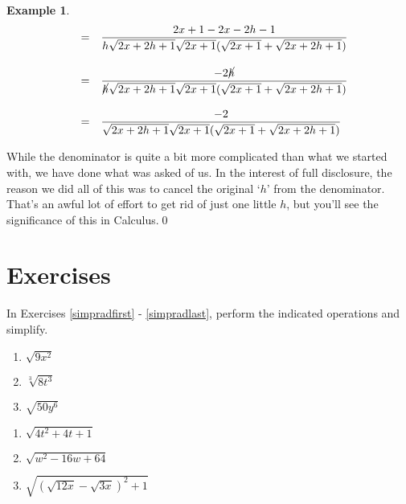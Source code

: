 \documentclass[11pt]{article}
\theoremstyle{definition}  %
\newtheorem{ex}{\bf Example}
\newcounter{HW}
\begin{document}
\begin{ex}
\[\begin{array}{rcl}
& = & \dfrac{2x+1 -2x-2h-1}{h\sqrt{2x+2h+1} \sqrt{2x+1}(\sqrt{2x+1} + \sqrt{2x+2h+1})} \\[20pt]

& = & \dfrac{-2\cancel{h}}{\cancel{h}\sqrt{2x+2h+1} \sqrt{2x+1}(\sqrt{2x+1} + \sqrt{2x+2h+1})} \\[20pt]
& = & \dfrac{-2}{\sqrt{2x+2h+1} \sqrt{2x+1}(\sqrt{2x+1} + \sqrt{2x+2h+1})} \\
\end{array}\] 

While the denominator is quite a bit more complicated than what we started with, we have done what was asked of us.  In the interest of full disclosure, the reason we did all of this was to cancel the original `$h$' from the denominator. That's an awful lot of effort to get rid of just one little $h$, but you'll see the significance of this in Calculus.\qed

\end{ex}

\newpage

\section{Exercises}

In Exercises \ref{simpradfirst} - \ref{simpradlast}, perform the indicated operations and simplify.

\begin{multicols}{3}
\begin{enumerate}

\item   $\sqrt{9x^2}$ \label{simpradfirst}

\item   $\sqrt[3]{8t^3}$

\item   $\sqrt{50y^6}$

\setcounter{HW}{\value{enumi}}
\end{enumerate}
\end{multicols}

\begin{multicols}{3}
\begin{enumerate}
\setcounter{enumi}{\value{HW}}

\item  $\sqrt{4t^2 + 4t + 1}$

\item  $\sqrt{w^2 - 16w + 64}$

\item  $\sqrt{(\sqrt{12x} - \sqrt{3x})^2+1}$

\setcounter{HW}{\value{enumi}}
\end{enumerate}
\end{multicols}
\end{document}
